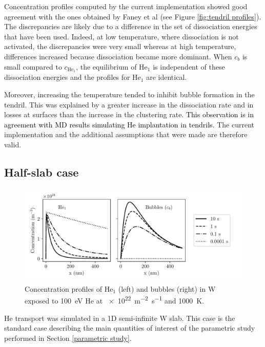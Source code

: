 Concentration profiles computed by the current implementation showed good agreement with the ones obtained by Faney et al (see Figure \ref{fig:tendril profiles}).
The discrepancies are likely due to a difference in the set of dissociation energies that have been used.
Indeed, at low temperature, where dissociation is not activated, the discrepancies were very small whereas at high temperature, differences increased because dissociation became more dominant.
When $c_b$ is small compared to $c_{\mathrm{He}_1}$, the equilibrium of $\mathrm{He}_1$ is independent of these dissociation energies and the profiles for $\mathrm{He}_1$ are identical.

Moreover, increasing the temperature tended to inhibit bubble formation in the tendril.
This was explained by a greater increase in the dissociation rate and in losses at surfaces than the increase in the clustering rate.
\textcolor{black}{This observation is in agreement with MD results simulating He implantation in tendrils.}
The current implementation and the additional assumptions that were made are therefore valid.

\subsection{Half-slab case} \label{half slab}

\begin{figure}
    \centering
    \includegraphics[width=\linewidth]{Figures/Chapter4/half_slab/profiles_half_slab.pdf}
    \caption{Concentration profiles of He$_1$ (left) and bubbles (right) in W exposed to \SI{100}{eV} He at \SI{e22}{m^{-2}.s^{-1}} and \SI{1000}{K}.}
    \label{fig:profiles half slab}
\end{figure}

He transport was simulated in a 1D semi-infinite W slab.
This case is the standard case describing the main quantities of interest of the parametric study performed in Section \ref{parametric study}.

